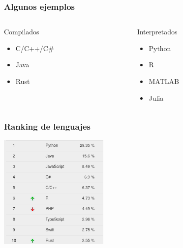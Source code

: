\documentclass[14pt,aspectratio=169,xcolor=dvipsnames]{beamer}
\begin{document}
\begin{frame}\frametitle{Algunos ejemplos}
    \begin{columns}
        \begin{column}{0.45\textwidth}
            Compilados
            \begin{itemize}
                \item C/C++/C\#
                \item Java
                \item Rust
            \end{itemize}
        \end{column}

        \begin{column}{0.45\textwidth}
            Interpretados
            \begin{itemize}
                \item Python
                \item R
                \item MATLAB
                \item Julia
            \end{itemize}
        \end{column}
    \end{columns}
\end{frame}
\begin{frame}\frametitle{Ranking de lenguajes}
    \begin{center}
        \includegraphics[width=0.4\textwidth]{../images/top-lenguajes.png}
    \end{center}
\end{frame}
\end{document}

